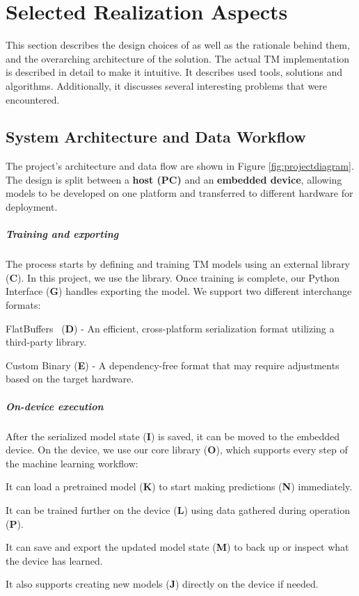 \chapter{Selected Realization Aspects}
\label{chap:realization-aspects}

This section describes the design choices of \LibraryName as well as the rationale behind them, and the overarching architecture of the solution. The actual TM implementation is described in detail to make it intuitive. It describes used tools, solutions and algorithms. Additionally, it discusses several interesting problems that were encountered.

\section{System Architecture and Data Workflow}\label{sec:system-architecture}
The project's architecture and data flow are shown in Figure \ref{fig:projectdiagram}. The design is split between a \textbf{host (PC)} and an \textbf{embedded device}, allowing models to be developed on one platform and transferred to different hardware for deployment.

\paragraph{Training and exporting}
The process starts by defining and training TM models using an external library (\textbf{C}). In this project, we use the \GreenTsetlinName library. Once training is complete, our Python Interface (\textbf{G}) handles exporting the model. We support two different interchange formats:
\begin{compactitem}
    \item FlatBuffers~\cite{flatbuffers} (\textbf{D}) - An efficient, cross-platform serialization format utilizing a third-party library.
    \item Custom Binary (\textbf{E}) - A dependency-free format that may require adjustments based on the target hardware.
\end{compactitem}

\paragraph{On-device execution}
After the serialized model state (\textbf{I}) is saved, it can be moved to the embedded device. On the device, we use our core library (\textbf{O}), which supports every step of the machine learning workflow:
\begin{compactitem}
    \item It can load a pretrained model (\textbf{K}) to start making predictions (\textbf{N}) immediately.
    \item It can be trained further on the device (\textbf{L}) using data gathered during operation (\textbf{P}).
    \item It can save and export the updated model state (\textbf{M}) to back up or inspect what the device has learned.
    \item It also supports creating new models (\textbf{J}) directly on the device if needed.
\end{compactitem}

